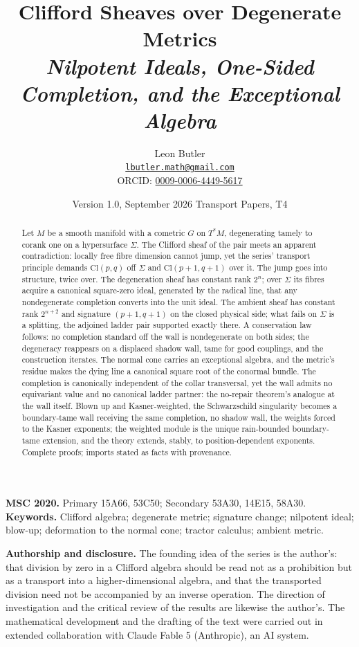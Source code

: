 \documentclass[11pt]{article}
\title{\bfseries Clifford Sheaves over Degenerate Metrics\\[4pt]
  \large\itshape Nilpotent Ideals, One-Sided Completion, and the Exceptional Algebra}
\author{Leon Butler\\ \normalsize\href{mailto:lbutler.math@gmail.com}{\texttt{lbutler.math@gmail.com}}\\ \normalsize ORCID: \href{https://orcid.org/0009-0006-4449-5617}{0009-0006-4449-5617}}
\date{Version 1.0, September 2026 \textperiodcentered{} Transport Papers, T4}
\theoremstyle{definition}
\newcommand{\Cl}{\mathrm{Cl}}
\newcommand{\Sig}{\Sigma}
\begin{document}
\maketitle

\begin{abstract}
\normalsize
Let $M$ be a smooth manifold with a cometric $G$ on $T^*M$, degenerating tamely to corank one on a hypersurface $\Sig$. The Clifford sheaf of the pair meets an apparent contradiction: locally free fibre dimension cannot jump, yet the series' transport principle demands $\Cl(p,q)$ off $\Sig$ and $\Cl(p{+}1,q{+}1)$ over it. The jump goes into structure, twice over. The degeneration sheaf has constant rank $2^n$; over $\Sig$ its fibres acquire a canonical square-zero ideal, generated by the radical line, that any nondegenerate completion converts into the unit ideal. The ambient sheaf has constant rank $2^{n+2}$ and signature $(p{+}1,q{+}1)$ on the closed physical side; what fails on $\Sig$ is a splitting, the adjoined ladder pair supported exactly there. A conservation law follows: no completion standard off the wall is nondegenerate on both sides; the degeneracy reappears on a displaced shadow wall, tame for good couplings, and the construction iterates. The normal cone carries an exceptional algebra, and the metric's residue makes the dying line a canonical square root of the conormal bundle. The completion is canonically independent of the collar transversal, yet the wall admits no equivariant value and no canonical ladder partner: the no-repair theorem's analogue at the wall itself. Blown up and Kasner-weighted, the Schwarzschild singularity becomes a boundary-tame wall receiving the same completion, no shadow wall, the weights forced to the Kasner exponents; the weighted module is the unique rain-bounded boundary-tame extension, and the theory extends, stably, to position-dependent exponents. Complete proofs; imports stated as facts with provenance.
\end{abstract}

\medskip
\noindent\textbf{MSC 2020.} Primary 15A66, 53C50; Secondary 53A30, 14E15, 58A30.\\
\textbf{Keywords.} Clifford algebra; degenerate metric; signature change; nilpotent ideal; blow-up; deformation to the normal cone; tractor calculus; ambient metric.

\newpage
\textbf{Authorship and disclosure. }The founding idea of the series is the author's: that division by zero in a Clifford algebra should be read not as a prohibition but as a transport into a higher-dimensional algebra, and that the transported division need not be accompanied by an inverse operation. The direction of investigation and the critical review of the results are likewise the author's. The mathematical development and the drafting of the text were carried out in extended collaboration with Claude Fable 5 (Anthropic), an AI system.
\end{document}
